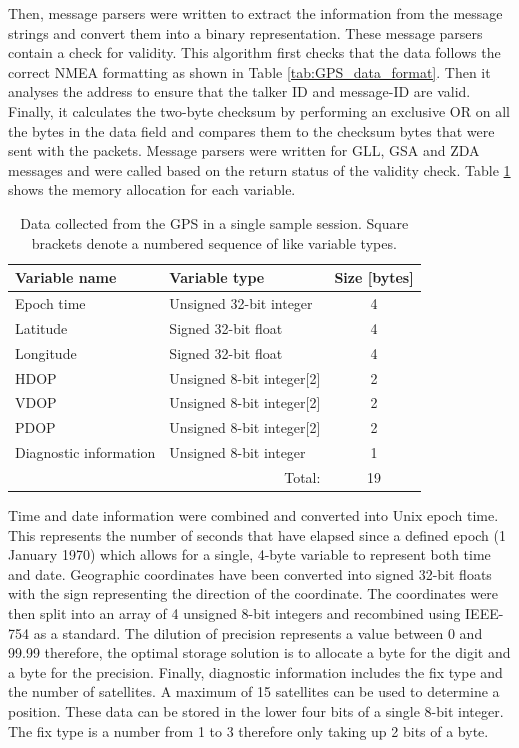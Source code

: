 Then, message parsers were written to extract the information from the message strings and convert them into a binary representation. These message parsers contain a check for validity. This algorithm first checks that the data follows the correct NMEA formatting as shown in Table \ref{tab:GPS_data_format}. Then it analyses the address to ensure that the talker ID and message-ID are valid. Finally, it calculates the two-byte checksum by performing an exclusive OR on all the bytes in the data field and compares them to the checksum bytes that were sent with the packets. Message parsers were written for GLL, GSA and ZDA messages and were called based on the return status of the validity check. Table \ref{tab:GPS_Data} shows the memory allocation for each variable. 

\begin{table}[H]
	\centering
	\caption{Data collected from the GPS in a single sample session. Square brackets denote a numbered sequence of like variable types.}
	\small
	\setlength{\extrarowheight}{5pt}
	\tiny
	\begin{tabular}{llc}
		\hline
		\textbf{Variable name} & \textbf{Variable type} & \textbf{Size [bytes]} \\
		\hline
		\hline
		Epoch time & Unsigned 32-bit integer & 4 \\
		Latitude & Signed 32-bit float & 4 \\
		Longitude & Signed 32-bit float & 4 \\
		HDOP & Unsigned 8-bit integer[2] & 2\\
		VDOP & Unsigned 8-bit integer[2] & 2\\
		PDOP & Unsigned 8-bit integer[2] & 2\\
		Diagnostic information & Unsigned 8-bit integer & 1 \\
		\hline
		\hline
		\cline{3-3}
		\multicolumn{2}{r}{Total: } & \multicolumn{1}{c}{19}\\
		\cline{3-3}
		
	\end{tabular}
	\label{tab:GPS_Data}
\end{table}

Time and date information were combined and converted into Unix epoch time. This represents the number of seconds that have elapsed since a defined epoch (1 January 1970) which allows for a single, 4-byte variable to represent both time and date. Geographic coordinates have been converted into signed 32-bit floats with the sign representing the direction of the coordinate. The coordinates were then split into an array of 4 unsigned 8-bit integers and recombined using IEEE-754 as a standard. The dilution of precision represents a value between 0 and 99.99 therefore, the optimal storage solution is to allocate a byte for the digit and a byte for the precision. Finally, diagnostic information includes the fix type and the number of satellites. A maximum of 15 satellites can be used to determine a position. These data can be stored in the lower four bits of a single 8-bit integer. The fix type is a number from 1 to 3 therefore only taking up 2 bits of a byte.\par 


